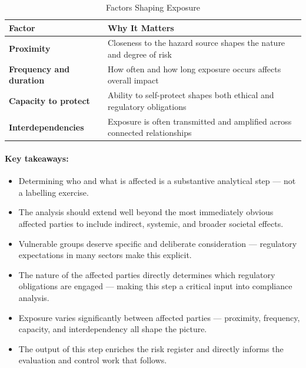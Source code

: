\begin{table}[H]
  \centering
  \renewcommand{\arraystretch}{1.5}
  \begin{tabularx}{\textwidth}{ | >{\raggedright\arraybackslash}p{} 
                                | >{\raggedright\arraybackslash}X | }
    \hline
    \textbf{Factor} & \textbf{Why It Matters} \\
    \hline
    \textbf{Proximity} & Closeness to the hazard source shapes the nature and degree of risk\\
    \hline
    \textbf{Frequency and duration} & How often and how long exposure occurs affects overall impact\\
    \hline
    \textbf{Capacity to protect} & Ability to self-protect shapes both ethical and regulatory obligations\\
    \hline
    \textbf{Interdependencies} & Exposure is often transmitted and amplified across connected relationships\\
    \hline
  \end{tabularx}
  \caption{Factors Shaping Exposure}
\end{table}
\newpage
\paragraph{Key takeaways:}
\begin{itemize}
  \item{Determining who and what is affected is a substantive analytical step — not a labelling exercise.}
  \item{The analysis should extend well beyond the most immediately obvious affected parties to include indirect, systemic, and broader societal effects.}
  \item{Vulnerable groups deserve specific and deliberate consideration — regulatory expectations in many sectors make this explicit.}
  \item{The nature of the affected parties directly determines which regulatory obligations are engaged — making this step a critical input into compliance analysis.}
  \item{Exposure varies significantly between affected parties — proximity, frequency, capacity, and interdependency all shape the picture.}
  \item{The output of this step enriches the risk register and directly informs the evaluation and control work that follows.}
\end{itemize}

